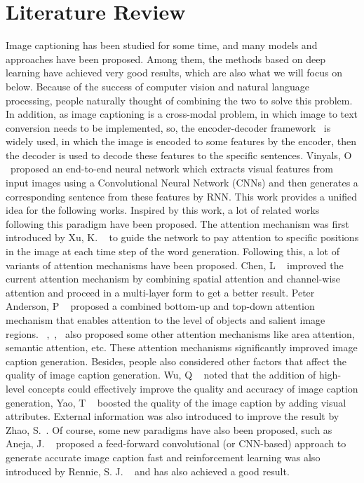 \documentclass[12pt]{article}
\begin{document}
	\section{Literature Review}
	Image captioning has been studied for some time, and many models and approaches have been proposed. Among them, the methods based on deep learning have achieved very good results, which are also what we will focus on below.
	Because of the success of computer vision and natural language processing, people naturally thought of combining the two to solve this problem. In addition, as image captioning is a cross-modal problem, in which image to text conversion needs to be implemented, so, the encoder-decoder framework~\cite{cho2014learning} is widely used, in which the image is encoded to some features by the encoder, then the decoder is used to decode these features to the specific sentences. Vinyals, O ~\cite{vinyals2015show}proposed an end-to-end neural network which extracts visual features from input images using a Convolutional Neural Network (CNNs) and then generates a corresponding sentence from these features by RNN. This work provides a unified idea for the following works. Inspired by this work, a lot of related works following this paradigm have been proposed. The attention mechanism was first introduced by Xu, K. ~\cite{xu2015show} to guide the network to pay attention to specific positions in the image at each time step of the word generation. Following this, a lot of variants of attention mechanisms have been proposed. Chen, L ~\cite{chen2017sca} improved the current attention mechanism by combining spatial attention and channel-wise attention and proceed in a multi-layer form to get a better result. Peter Anderson, P ~\cite{anderson2018bottom} proposed a combined bottom-up and top-down attention mechanism that enables attention to the level of objects and salient image regions. ~\cite{pedersoli2017areas},~\cite{you2016image},~\cite{lu2017knowing} also proposed some other attention mechanisms like area attention, semantic attention, etc. These attention mechanisms significantly improved image caption generation. Besides, people also considered other factors that affect the quality of image caption generation. Wu, Q ~\cite{wu2016value} noted that the addition of high-level concepts could effectively improve the quality and accuracy of image caption generation, Yao, T  ~\cite{yao2017boosting} boosted the quality of the image caption by adding visual attributes. External information was also introduced to improve the result by Zhao, S.~\cite{zhao2019informative}. Of course, some new paradigms have also been proposed, such as Aneja, J. ~\cite{aneja2018convolutional} proposed a feed-forward convolutional (or CNN-based) approach to generate accurate image caption fast and reinforcement learning was also introduced by Rennie, S. J. ~\cite{rennie2017self} and has also achieved a good result.\par
\end{document}
